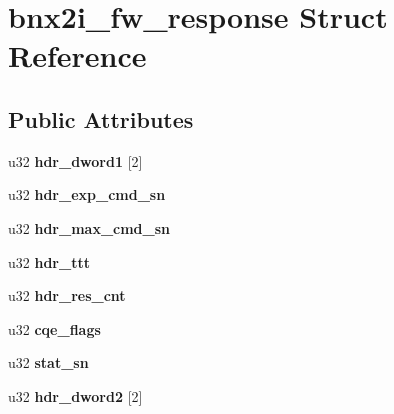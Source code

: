 \hypertarget{structbnx2i__fw__response}{
\section{bnx2i\_\-fw\_\-response Struct Reference}
\label{structbnx2i__fw__response}
}
\subsection*{Public Attributes}
\begin{DoxyCompactItemize}
\item 
\hypertarget{structbnx2i__fw__response_a0b0f55cd567ffcd99512734ddfabb556}{
u32 {\bfseries hdr\_\-dword1} \mbox{[}2\mbox{]}}
\label{structbnx2i__fw__response_a0b0f55cd567ffcd99512734ddfabb556}

\item 
\hypertarget{structbnx2i__fw__response_afe70660f179adab830eb45eb61fa5284}{
u32 {\bfseries hdr\_\-exp\_\-cmd\_\-sn}}
\label{structbnx2i__fw__response_afe70660f179adab830eb45eb61fa5284}

\item 
\hypertarget{structbnx2i__fw__response_a1bf4c840bebb5c54f68bc09c83847b52}{
u32 {\bfseries hdr\_\-max\_\-cmd\_\-sn}}
\label{structbnx2i__fw__response_a1bf4c840bebb5c54f68bc09c83847b52}

\item 
\hypertarget{structbnx2i__fw__response_a568471bea6234d1b833c666c76dec16c}{
u32 {\bfseries hdr\_\-ttt}}
\label{structbnx2i__fw__response_a568471bea6234d1b833c666c76dec16c}

\item 
\hypertarget{structbnx2i__fw__response_a4407e4f419f61b67d5ca4dfab6ad3fa7}{
u32 {\bfseries hdr\_\-res\_\-cnt}}
\label{structbnx2i__fw__response_a4407e4f419f61b67d5ca4dfab6ad3fa7}

\item 
\hypertarget{structbnx2i__fw__response_a99ab12bd131e00d950b9c7df6dce92e0}{
u32 {\bfseries cqe\_\-flags}}
\label{structbnx2i__fw__response_a99ab12bd131e00d950b9c7df6dce92e0}

\item 
\hypertarget{structbnx2i__fw__response_adc58a2ceefc28c414af3d890b6e6255f}{
u32 {\bfseries stat\_\-sn}}
\label{structbnx2i__fw__response_adc58a2ceefc28c414af3d890b6e6255f}

\item 
\hypertarget{structbnx2i__fw__response_a54ba6083c74e6a40c5b1a6e074d780c4}{
u32 {\bfseries hdr\_\-dword2} \mbox{[}2\mbox{]}}
\label{structbnx2i__fw__response_a54ba6083c74e6a40c5b1a6e074d780c4}


\end{DoxyCompactItemize}
